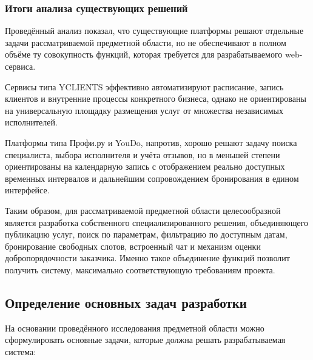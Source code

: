 \subsubsection{Итоги анализа существующих решений}

Проведённый анализ показал, что существующие платформы решают отдельные задачи рассматриваемой предметной области, но не обеспечивают в полном объёме ту совокупность функций, которая требуется для разрабатываемого web-сервиса.

Сервисы типа YCLIENTS эффективно автоматизируют расписание, запись клиентов и внутренние процессы конкретного бизнеса, однако не ориентированы на универсальную площадку размещения услуг от множества независимых исполнителей.

Платформы типа Профи.ру и YouDo, напротив, хорошо решают задачу поиска специалиста, выбора исполнителя и учёта отзывов, но в меньшей степени ориентированы на календарную запись с отображением реально доступных временных интервалов и дальнейшим сопровождением бронирования в едином интерфейсе.

Таким образом, для рассматриваемой предметной области целесообразной является разработка собственного специализированного решения, объединяющего публикацию услуг, поиск по параметрам, фильтрацию по доступным датам, бронирование свободных слотов, встроенный чат и механизм оценки добропорядочности заказчика. Именно такое объединение функций позволит получить систему, максимально соответствующую требованиям проекта.

\subsection{Определение основных задач разработки}

На основании проведённого исследования предметной области можно сформулировать основные задачи, которые должна решать разрабатываемая система:

